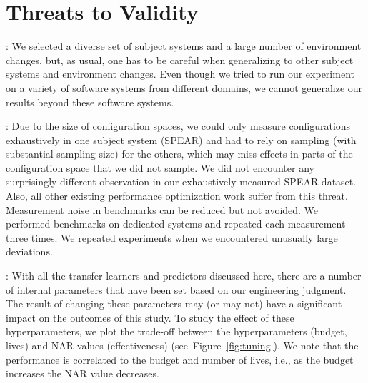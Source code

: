 \documentclass[10pt,journal,compsoc]{IEEEtran}
\newcommand{\fig}[1]{Figure~\ref{fig:#1}}
\begin{document}
\section{Threats to Validity}
\label{sect:threats}

: We selected a diverse set of subject systems and a large number of environment changes, but, as usual, one has to be careful when generalizing to other subject systems and environment changes. Even though we tried to run our experiment on a variety of software systems from different domains, we cannot generalize our results beyond these software systems.


: Due to the size of configuration spaces, we could only measure configurations exhaustively in one subject system (SPEAR) and had to rely on sampling (with substantial sampling size) for the others, which may miss effects in parts of the configuration space that we did not sample. We did not encounter any surprisingly different observation in our exhaustively measured {\sc SPEAR} dataset. Also, all other existing performance optimization work suffer from this threat.
Measurement noise in benchmarks can be reduced but not avoided. We performed benchmarks on dedicated systems and repeated each measurement three times. We repeated experiments when we encountered unusually large deviations.

: With all the transfer learners and predictors discussed here, there
are a number of internal parameters that have been set based on our engineering judgment. The result of changing these parameters may (or may not) have a significant impact on the outcomes of this study. To study the effect of these hyperparameters, we plot the trade-off between the hyperparameters (budget, lives) and NAR values (effectiveness) (see~\fig{tuning}). We note that the performance is correlated to the budget and number of lives, i.e., as the budget increases the NAR value decreases.
\end{document}

